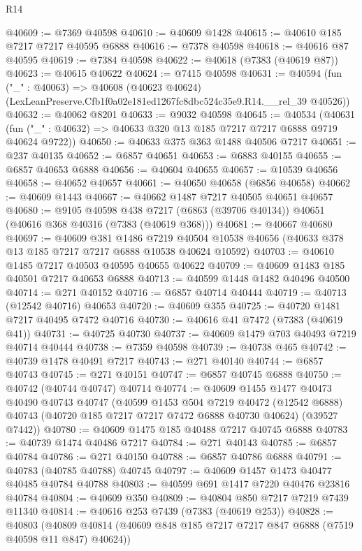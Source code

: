 \begin{lexlean}{R14}
\begin{coremodule}
@40609 := @7369 @40598
@40610 := @40609 @1428
@40615 := @40610 @185 @7217 @7217 @40595 @6888
@40616 := @7378 @40598
@40618 := @40616 @87 @40595
@40619 := @7384 @40598
@40622 := @40618 (@7383 (@40619 @87))
@40623 := @40615 @40622
@40624 := @7415 @40598
@40631 := @40594
    (fun ("_" : @40063) =>
    @40608 (@40623 @40624) (LexLeanPreserve.Cfb1f0a02e181ed1267fc8dbc524c35e9.R14.__rel_39 @40526))
@40632 := @40062 @8201
@40633 := @9032 @40598
@40645 := @40534
    (@40631 (fun ("_" : @40632) => @40633 @320 @13 @185 @7217 @7217 @6888 @9719 @40624 @9722))
@40650 := @40633 @375 @363 @1488 @40506 @7217
@40651 := @237 @40135
@40652 := @6857 @40651
@40653 := @6883 @40155
@40655 := @6857 @40653 @6888
@40656 := @40604 @40655
@40657 := @10539 @40656
@40658 := @40652 @40657
@40661 := @40650 @40658 (@6856 @40658)
@40662 := @40609 @1443
@40667 := @40662 @1487 @7217 @40505 @40651 @40657
@40680 := @9105
    @40598
    @438
    @7217
    (@6863 (@39706 @40134))
    @40651
    (@40616 @368 @40316 (@7383 (@40619 @368)))
@40681 := @40667 @40680
@40697 := @40609
    @381
    @1486
    @7219
    @40504
    @10538
    @40656
    (@40633 @378 @13 @185 @7217 @7217 @6888 @10538 @40624 @10592)
@40703 := @40610 @1485 @7217 @40503 @40595 @40655 @40622
@40709 := @40609 @1483 @185 @40501 @7217 @40653 @6888
@40713 := @40599 @1448 @1482 @40496 @40500
@40714 := @271 @40152
@40716 := @6857 @40714 @40444
@40719 := @40713 (@12542 @40716) @40653
@40720 := @40609 @355
@40725 := @40720 @1481 @7217 @40495 @7472 @40716
@40730 := @40616 @41 @7472 (@7383 (@40619 @41))
@40731 := @40725 @40730
@40737 := @40609 @1479 @703 @40493 @7219 @40714 @40444
@40738 := @7359 @40598
@40739 := @40738 @465
@40742 := @40739 @1478 @40491 @7217
@40743 := @271 @40140
@40744 := @6857 @40743
@40745 := @271 @40151
@40747 := @6857 @40745 @6888
@40750 := @40742 (@40744 @40747) @40714
@40774 := @40609
    @1455
    @1477
    @40473
    @40490
    @40743
    @40747
    (@40599
      @1453
      @504
      @7219
      @40472
      (@12542 @6888)
      @40743
      (@40720 @185 @7217 @7217 @7472 @6888 @40730 @40624)
      (@39527 @7442))
@40780 := @40609 @1475 @185 @40488 @7217 @40745 @6888
@40783 := @40739 @1474 @40486 @7217
@40784 := @271 @40143
@40785 := @6857 @40784
@40786 := @271 @40150
@40788 := @6857 @40786 @6888
@40791 := @40783 (@40785 @40788) @40745
@40797 := @40609 @1457 @1473 @40477 @40485 @40784 @40788
@40803 := @40599 @691 @1417 @7220 @40476 @23816 @40784
@40804 := @40609 @350
@40809 := @40804 @850 @7217 @7219 @7439 @11340
@40814 := @40616 @253 @7439 (@7383 (@40619 @253))
@40828 := @40803
    (@40809 @40814 (@40609 @848 @185 @7217 @7217 @847 @6888 (@7519 @40598 @11 @847) @40624))

\end{coremodule}
\end{lexlean}
